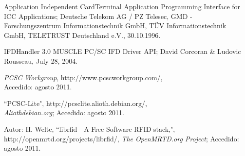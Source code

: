 \documentclass[%
        final,
        notitlepage,
        narroweqnarray,
        inline,
        ]{ieee}
\begin{document}
\begin{thebibliography}{15}
 Application Independent CardTerminal Application Programming Interface for ICC Applications; 
Deutsche Telekom AG / PZ Telesec, GMD - Forschungszentrum Informationstechnik GmbH, TÜV Informationstechnik GmbH, TELETRUST Deutschland e.V., 30.10.1996.

 IFDHandler 3.0 MUSCLE PC/SC IFD Driver API; David Corcoran \& Ludovic Rousseau, July 28, 2004.

 \textit{PCSC Workgroup}, http://www.pcscworkgroup.com/, \\
Accedido: agosto 2011.

 ``PCSC-Lite", http://pcsclite.alioth.debian.org/, \\
\textit{Aliothdebian.org}; Accedido: agosto 2011.

 Autor: H. Welte, ``librfid - A Free Software RFID stack,", http://openmrtd.org/projects/librfid/, \textit{The OpenMRTD.org Project}; Accedido: agosto 2011.

\end{thebibliography}



\end{document}
